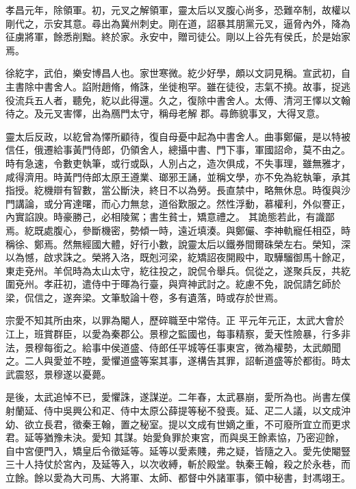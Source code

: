 \begin{pinyinscope}
 孝昌元年，除領軍。初，元叉之解領軍，靈太后以叉腹心尚多，恐難卒制，故權以剛代之，示安其意。尋出為冀州刺史。剛在道，詔暴其朋黨元叉，逼脅內外，降為征虜將軍，餘悉削黜。終於家。永安中，贈司徒公。剛以上谷先有侯氏，於是始家焉。



 徐紇字，武伯，樂安博昌人也。家世寒微。紇少好學，頗以文詞見稱。宣武初，自主書除中書舍人。諂附趙脩，脩誅，坐徙枹罕。雖在徒役，志氣不撓。故事，捉逃役流兵五人者，聽免，紇以此得還。久之，復除中書舍人。太傅、清河王懌以文翰待之。及元叉害懌，出為鴈門太守，稱母老解
 郡。尋飾貌事叉，大得叉意。



 靈太后反政，以紇曾為懌所顧待，復自母憂中起為中書舍人。曲事鄭儼，是以特被信任，俄遷給事黃門侍郎，仍領舍人，總攝中書、門下事，軍國詔命，莫不由之。時有急速，令數吏執筆，或行或臥，人別占之，造次俱成，不失事理，雖無雅才，咸得濟用。時黃門侍郎太原王遵業、瑯邪王誦，並稱文學，亦不免為紇執筆，承其指授。紇機辯有智數，當公斷決，終日不以為勞。長直禁中，略無休息。時復與沙門講論，或分宵達曙，而心力無怠，道俗歎服之。然性浮動，慕權利，外似謇正，內實諂諛。時豪勝己，必相陵駕；書生貧士，矯意禮之。
 其詭態若此，有識鄙焉。紇既處腹心，參斷機密，勢傾一時，遠近填湊。與鄭儼、李神軌寵任相亞，時稱徐、鄭焉。然無經國大體，好行小數，說靈太后以鐵券間爾硃榮左右。榮知，深以為憾，啟求誅之。榮將入洛，既剋河梁，紇矯詔夜開殿中，取驊騮御馬十餘疋，東走兗州。羊侃時為太山太守，紇往投之，說侃令舉兵。侃從之，遂聚兵反，共紇圍兗州。孝莊初，遣侍中于暉為行臺，與齊神武討之。紇慮不免，說侃請乞師於梁，侃信之，遂奔梁。文筆駮論十卷，多有遺落，時或存於世焉。



 宗愛不知其所由來，以罪為閹人，歷碎職至中常侍。正
 平元年元正，太武大會於江上，班賞群臣，以愛為秦郡公。景穆之監國也，每事精察，愛天性險暴，行多非法，景穆每銜之。給事中侯道盛、侍郎任平城等任事東宮，微為權勢，太武頗聞之。二人與愛並不睦，愛懼道盛等案其事，遂構告其罪，詔斬道盛等於都街。時太武震怒，景穆遂以憂薨。



 是後，太武追悼不已，愛懼誅，遂謀逆。二年春，太武暴崩，愛所為也。尚書左僕射蘭延、侍中吳興公和疋、侍中太原公薛提等秘不發喪。延、疋二人議，以文成沖幼、欲立長君，徵秦王翰，置之秘室。提以文成有世嫡之重，不可廢所宜立而更求君。延等猶豫未決。愛知
 其謀。始愛負罪於東宮，而與吳王餘素協，乃密迎餘，自中宮便門入，矯皇后令徵延等。延等以愛素賤，弗之疑，皆隨之入。愛先使閹豎三十人持仗於宮內，及延等入，以次收縛，斬於殿堂。執秦王翰，殺之於永巷，而立餘。餘以愛為大司馬、大將軍、太師、都督中外諸軍事，領中秘書，封馮翊王。




\end{pinyinscope}
